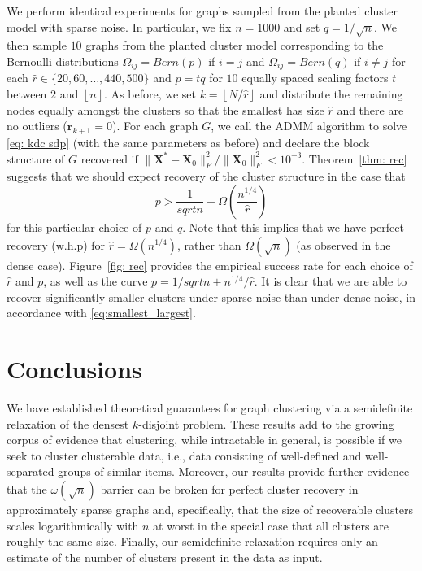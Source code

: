 \documentclass[twoside,11pt]{article}
\renewcommand{\r}{\mathbf{r}}
\newcommand{\bs}{\boldsymbol}
\newcommand{\X}{\bs {X}}
\newcommand{\0}{\bs{0}}
\newcommand{\rbra}[1]{\ensuremath{\left( #1 \right)}} %
\newcommand{\floor}[1]{\ensuremath{\left\lfloor #1 \right\rfloor}}
\begin{document}
{%
We perform identical experiments for graphs sampled from the planted cluster model with sparse noise.
In particular, we fix \( n =1000\) and set $q = 1/\sqrt{n}$. We then sample \(10\) graphs
from the planted cluster model corresponding to the Bernoulli
distributions \(\Omega_{ij} = Bern(p)\) if $i =j$ and \(\Omega_{ij} = Bern(q)\) if $i\neq j$ for each
\( \hat r \in \{20,60,\dots, 440, 500\}\) and $p = tq$ for $10$ equally spaced scaling factors $t$ between $2$ and $\floor{n}$.
As before, we set $k = \floor{N/\hat r}$ and distribute the remaining nodes equally amongst the clusters so that the smallest has size $\hat{r}$ and there are no outliers ($\r_{k+1} = 0$).
For each graph \(G\), we call the ADMM algorithm to solve \eqref{eq: kdc sdp} (with the same parameters as before)
and declare the block structure of \(G\) recovered if \(\|\X^* - \X_0\|^2_F / \|\X_0\|^2_F < 10^{-3} \).
Theorem~\ref{thm: rec} suggests that we should expect recovery of the cluster structure in the case that
\[
	p > \frac{1}{sqrt{n}} + \Omega\rbra{\frac{n^{1/4}}{\hat r}}
\]
for this particular choice of $p$ and $q$.
Note that this implies that we have perfect recovery (w.h.p) for $\hat r = \Omega(n^{1/4})$, rather than $\Omega(\sqrt{n})$ (as observed in the dense case).
Figure~\ref{fig: rec} provides the empirical success rate for each choice of \(\hat r\) and \(p\), as well as the curve \(p = 1/sqrt{n} + n^{1/4}/\hat{r}\).
It is clear that we are able to recover significantly smaller clusters under sparse noise than under dense noise, in accordance with \eqref{eq:smallest_largest}.

\section{Conclusions}
\label{sec: con}
We have established theoretical guarantees for graph clustering via a semidefinite relaxation of the densest \(k\)-disjoint problem.
These results add to the growing corpus of evidence that clustering, while intractable in general,
is possible if we seek to cluster clusterable data, i.e., data consisting of well-defined and well-separated groups of similar items.
Moreover, our results provide further evidence that the \(\omega(\sqrt{n})\) barrier can be broken for perfect cluster recovery in approximately sparse graphs and, specifically, that the size of recoverable clusters
scales logarithmically with \(n\) at worst in the special case that all clusters
are roughly the same size.
Finally, our semidefinite relaxation requires only an estimate of the
number of clusters present in the data as input.

}
\end{document}
